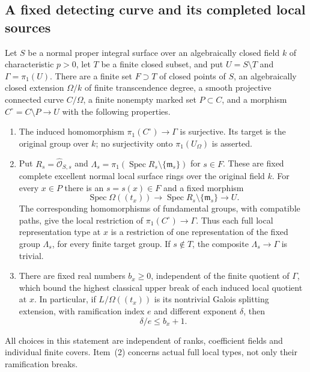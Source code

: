 \subsection{A fixed detecting curve and its completed local sources}

\begin{lemma}
\label{D:finite-puncture-detecting-curve-local-types}
Let $S$ be a normal proper integral surface over an algebraically
closed field $k$ of characteristic $p>0$, let $T$ be a finite closed
subset, and put $U=S\setminus T$ and $\Gamma=\pi_1(U)$.
There are a finite set $F\supset T$ of closed points of $S$, an
algebraically closed extension $\Omega/k$ of finite transcendence
degree, a smooth projective connected curve $C/\Omega$, a finite
nonempty marked set $P\subset C$, and a morphism
$C^\circ=C\setminus P\to U$ with the following properties.
\begin{enumerate}
\item The induced homomorphism $\pi_1(C^\circ)\to\Gamma$ is
surjective. Its target is the original group over $k$; no
surjectivity onto $\pi_1(U_\Omega)$ is asserted.
\item Put $R_s=\widehat{\mathcal O}_{S,s}$ and
$\Lambda_s=\pi_1(\operatorname{Spec}R_s\setminus\{\mathfrak m_s\})$
for $s\in F$. These are fixed complete excellent normal local
surface rings over the original field $k$. For every $x\in P$
there is an $s=s(x)\in F$ and a fixed morphism
\[
 \operatorname{Spec}\Omega((t_x))\longrightarrow
 \operatorname{Spec}R_s\setminus\{\mathfrak m_s\}
 \longrightarrow U .                                      \tag{D.DC.1}
\]
The corresponding homomorphisms of fundamental groups, with
compatible paths, give the local restriction of
$\pi_1(C^\circ)\to\Gamma$. Thus each full local representation
type at $x$ is a restriction of one representation of the fixed
group $\Lambda_s$, for every finite target group. If $s\notin T$,
the composite $\Lambda_s\to\Gamma$ is trivial.
\item There are fixed real numbers $b_x\ge0$, independent of the
finite quotient of $\Gamma$, which bound the highest classical
upper break of each induced local quotient at $x$. In particular,
if $L/\Omega((t_x))$ is its nontrivial Galois splitting extension,
with ramification index $e$ and different exponent $\delta$, then
\[
                    \delta/e\le b_x+1.                    \tag{D.DC.2}
\]
\end{enumerate}
All choices in this statement are independent of ranks, coefficient
fields and individual finite covers. Item~(2) concerns actual full
local types, not only their ramification breaks.
\end{lemma}

